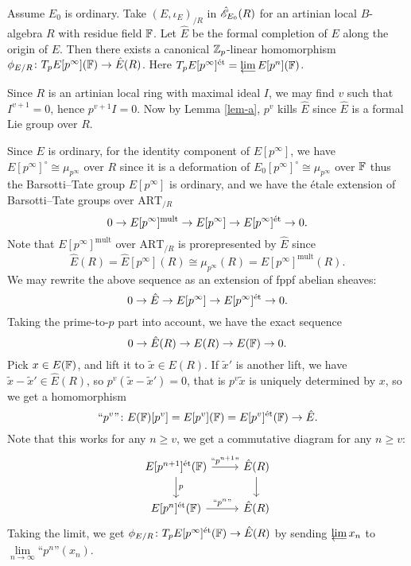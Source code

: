 \documentclass[twoside]{article}
\begin{document}
\begin{lemma}
    Assume $E_{0}$ is ordinary.
    Take $(E,\iota_{E})_{/R}$ in $\hat{\mathscr{E}}_{E_{0}}(R)$ 
    for an artinian local $B$-algebra $R$ with residue field $\mathbb{F}$.
    Let $\hat{E}$ be the formal completion of $E$ along the origin of $E$.
    Then there exists a canonical $\mathbb{Z}_{p}$-linear homomorphism $\phi_{E/R}\colon T_{p}E[p^{\infty}](\mathbb{F})\to \hat{E}(R)$.
    Here $T_{p}E[p^{\infty}]^{\et}=\liminv E[p^{n}](\Fb)$.
\end{lemma}

\pf
    Since $R$ is an artinian local ring with maximal ideal $I$,
    we may find $v$ such that $I^{v+1}=0$, hence $p^{v+1}I=0$.
    Now by Lemma \ref{lem-a}, $p^{v}$ kills $\hat{E}$ since $\hat{E}$ is a formal Lie group over $R$.

    Since $E$ is ordinary, for the identity component of $E[p^{\infty}]$,
    we have $E[p^{\infty}]^{\circ}\cong \mu_{p^{\infty}}$ over $R$ 
    since it is a deformation of $E_{0}[p^{\infty}]^{\circ}\cong \mu_{p^{\infty}}$ over $\mathbb{F}$ 
    thus the Barsotti--Tate group $E[p^{\infty}]$ is ordinary,
    and we have the \'etale extension of Barsotti--Tate groups over $\mathrm{ART}_{/R}$
    \[ 0\to E[p^{\infty}]^{\mathrm{mult}}\to E[p^{\infty}] \to E[p^{\infty}]^{\textup{\'et}} \to 0 . \]
    Note that $E[p^{\infty}]^{\mathrm{mult}}$ over $\mathrm{ART}_{/R}$ is prorepresented by $\hat{E}$ since 
    \[  \hat{E}(R)=\hat{E}[p^{\infty}](R)\cong \mu_{p^{\infty}}(R)=E[p^{\infty}]^{\mathrm{mult}}(R) . \]
    We may rewrite the above sequence as an extension of fppf abelian sheaves:
    \[ 0\to \hat{E}\to E[p^{\infty}] \to E[p^{\infty}]^{\textup{\'et}} \to 0 . \]
    Taking the prime-to-$p$ part into account, we have the exact sequence 
    \[ 0\to \hat{E}(R) \to E(R) \to E(\mathbb{F}) \to 0 . \]
    Pick $x\in E(\mathbb{F})$, and lift it to $\tilde{x}\in E(R)$.
    If $\tilde{x}'$ is another lift, we have $\tilde{x}-\tilde{x}'\in \hat{E}(R)$,
    so $p^{v}(\tilde{x}-\tilde{x}')=0$, that is $p^{v}\tilde{x}$ is uniquely determined by $x$, so we get a homomorphism 
    \[ \text{``}p^{v}\text{''}\colon  E(\mathbb{F})[p^{v}]=E[p^{v}](\mathbb{F})=E[p^{v}]^{\textup{\'et}}(\mathbb{F})\to \hat{E} .  \]
    Note that this works for any $n\geq v$, we get a commutative diagram for any $n\geq v$:
    \[ \begin{tikzcd}
        E[p^{n+1}]^{\et}(\Fb)\ar[r, "\text{``}p^{n+1}\text{''}"]\ar[d, "p"]&\hat{E}(R) \ar[d] \\
        E[p^{n}]^{\et}(\Fb)\ar[r, "\text{``}p^{n}\text{''}"]&\hat{E}(R)
    \end{tikzcd} \]
    Taking the limit, we get $\phi_{E/R}\colon T_{p}E[p^{\infty}]^{\textup{\'et}}(\mathbb{F})\to \hat{E}(R)$ 
    by sending $\liminv x_{n}$ to $\underset{n \to \infty}{\lim}\text{``}p^{n}\text{''}(x_{n})$.
\epf
\end{document}
